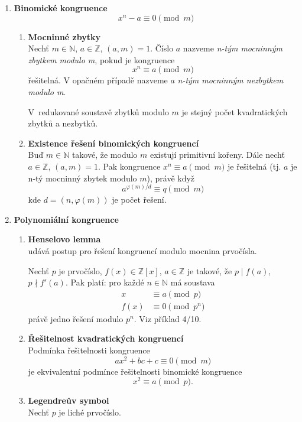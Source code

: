 \documentclass[12pt,a4paper]{article}
\begin{document}
\begin{enumerate}
	\item \textbf{Binomické kongruence}
		\[ x^n -a \equiv 0 \pmod{m} \]

	\begin{enumerate}
		\item \textbf{Mocninné zbytky}\\
			Nechť $m \in \mathbb{N}$, $a \in \mathbb{Z}$, $(a,m) = 1$. Číslo $a$
			nazveme \textit{n-tým mocninným zbytkem modulo m}, pokud je kongruence
			\[ x^n \equiv a \pmod{m} \]
			řešitelná. V opačném případě nazveme $a$ \textit{n-tým mocninným
			nezbytkem modulo m}.

			V~redukované soustavě zbytků modulo $m$ je stejný počet
			kvadratických zbytků a nezbytků.

		\item \textbf{Existence řešení binomických kongruencí}\\
			Buď $m \in \mathbb{N}$ takové, že modulo $m$ existují primitivní
			kořeny.  Dále nechť $a \in \mathbb{Z}$, $(a,m) = 1$. Pak kongruence
			$x^n \equiv a \pmod{m}$ je řešitelná (tj. $a$ je n-tý mocninný
			zbytek modulo $m$), právě když
			\[ a^{\varphi(m)/d} \equiv q \pmod{m} \]
			kde $d = (n, \varphi(m))$ je počet řešení.
	\end{enumerate}

	\item \textbf{Polynomiální kongruence}
	\begin{enumerate}
		\item \textbf{Henselovo lemma}\\
			udává postup pro řešení kongruencí modulo mocnina
			prvočísla.

			Nechť $p$ je prvočíslo, $f(x) \in \mathbb{Z}[x]$, $a \in
			\mathbb{Z}$ je takové, že $p \mid f(a)$, $p \nmid f'(a)$. Pak
			platí: pro každé $n \in \mathbb{N}$ má soustava
			\begin{align*}
				x &\equiv a \pmod{p}\\
				f(x) &\equiv 0 \pmod{p^n}
			\end{align*}
			právě jedno řešení modulo $p^n$. Viz příklad 4/10.

		\item \textbf{Řešitelnost kvadratických kongruencí}\\
			Podmínka řešitelnosti kongruence
			\[ ax^2 + bc + c \equiv 0 \pmod{m} \]
			je ekvivalentní podmínce řešitelnosti binomické kongruence
			\[ x^2 \equiv a \pmod{p}. \]

		\item \textbf{Legendreův symbol}\\
			Nechť $p$ je liché prvočíslo.


\end{enumerate}
\end{enumerate}
\end{document}
